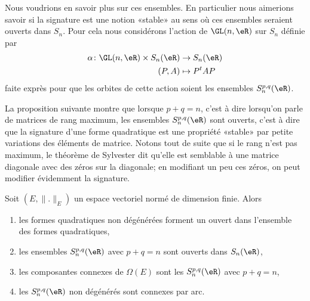 Nous voudrions en savoir plus sur ces ensembles. En particulier nous aimerions savoir si la signature est une notion «stable» au sens où ces ensembles seraient ouverts dans \( S_n\). Pour cela nous considérons l'action de \( \GL(n,\eR)\) sur \( S_n\) définie par
\begin{equation}
    \begin{aligned}
        \alpha\colon \GL(n,\eR)\times S_n(\eR)&\to S_n(\eR) \\
        (P,A)&\mapsto P^tAP 
    \end{aligned}
\end{equation}
faite exprès pour que les orbites de cette action soient les ensembles \( S_n^{p,q}(\eR)\).

La proposition suivante montre que lorsque \( p+q=n\), c'est à dire lorsqu'on parle de matrices de rang maximum, les ensembles \( S_n^{p,q}(\eR)\) sont ouverts, c'est à dire que la signature d'une forme quadratique est une propriété «stable» par petite variations des éléments de matrice. Notons tout de suite que si le rang n'est pas maximum, le théorème de Sylvester dit qu'elle est semblable à une matrice diagonale avec des zéros sur la diagonale; en modifiant un peu ces zéros, on peut modifier évidemment la signature.
\begin{proposition} \label{PropNPbnsMd}
    Soit \( (E,\| . \|_{E})\) un espace vectoriel normé de dimension finie. Alors
    \begin{enumerate}
        \item
            les formes quadratiques non dégénérées forment un ouvert dans l'ensemble des formes quadratiques,
        \item
            les ensembles \( S_n^{p,q}(\eR)\) avec \( p+q=n\) sont ouverts dans \( S_n(\eR)\),
        \item   \label{ItemGOhRIiViii}
            les composantes connexes de \( \Omega(E)\) sont les \( S_n^{p,q}(\eR)\) avec \( p+q=n\),
        \item   \label{ItemGOhRIiViv}
            les \( S_n^{p,q}(\eR)\) non dégénérés sont connexes par arc.
    \end{enumerate}
\end{proposition}


